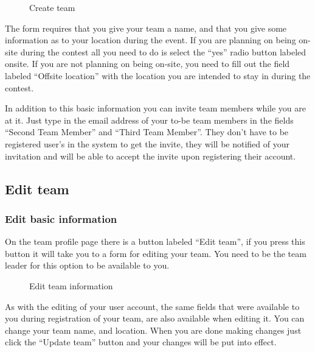 \begin{figure}
\centering
 \caption{Create team}
 \label{fig:createTeam}
\end{figure}

The form requires that you give your team a name, and that you give some
information as to your location during the event. If you are planning
on being on-site during the contest all you need to do is select the
{\textquotedblleft}yes{\textquotedblright} radio button labeled onsite.
If you are not planning on being on-site, you need to fill out the
field labeled {\textquotedblleft}Offsite location{\textquotedblright}
with the location you are intended to stay in during the contest. 


In addition to this basic information you can invite team members while
you are at it. Just type in the email address of your to-be team
members in the fields {\textquotedblleft}Second Team
Member{\textquotedblright} and {\textquotedblleft}Third Team
Member{\textquotedblright}. They don{\textquoteright}t have to be
registered user{\textquoteright}s in the system to get the invite, they
will be notified of your invitation and will be able to accept the
invite upon registering their account. 

\subsection{Edit team}

\subsubsection{Edit basic information}

On the team profile page there is a button labeled
{\textquotedblleft}Edit team{\textquotedblright}, if you press this
button it will take you to a form for editing your team. You need to be
the team leader for this option to be available to you. 

\begin{figure}
\centering
	\caption{Edit team information}
	\label{fig:editTeamInfo}
\end{figure}

As with the editing of your user account, the same fields that were
available to you during registration of your team, are also available
when editing it. You can change your team name, and location. When you
are done making changes just click the {\textquotedblleft}Update
team{\textquotedblright} button and your changes will be put into
effect. 

